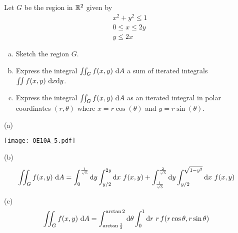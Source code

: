 \subsection*{\Application}
\begin{question}[M200 2010A] %
Let $G$ be the region in $\mathbb{R}^2$ given by
\begin{gather*}
x^2 + y^2 \le 1 \\
0 \le x \le 2y \\
y \le 2x
\end{gather*}
\begin{enumerate}[(a)]
\item
Sketch the region $G$.
\item
Express the integral $\dblInt_G f(x,y)\ \dee{A}$ 
a sum of iterated integrals $\iint f(x, y)\ \mathrm{d}x\mathrm{d}y$.
\item
Express the integral $\dblInt_G f(x,y)\ \dee{A}$ 
as an iterated integral in polar coordinates $(r, \theta)$ where $x = r \cos(\theta)$ and 
$y = r \sin(\theta)$.
\end{enumerate}
\end{question}

%

\begin{answer}
(a)
\begin{center}
     \texttt{[image: OE10A\_5.pdf]}
\end{center}

(b)
\begin{align*}
\iint_G f(x,y)\ \mathrm{d}A
&=\int_0^{\frac{1}{\sqrt{5}}}\mathrm{d}y\int_{y/2}^{2y}\mathrm{d}x\ f(x,y)
 +\int_{\frac{1}{\sqrt{5}}}^{\frac{2}{\sqrt{5}}}\mathrm{d}y\int_{y/2}^{\sqrt{1-y^2}}
         \mathrm{d}x\ f(x,y)
\end{align*}

(c)
\begin{align*}
\iint_G f(x,y)\ \mathrm{d}A
&=\int_{\arctan\frac{1}{2}}^{\arctan 2}\mathrm{d}\theta
       \int_0^1\mathrm{d}r\ r\,f(r\cos\theta,r\sin\theta)
\end{align*}
\end{answer}

